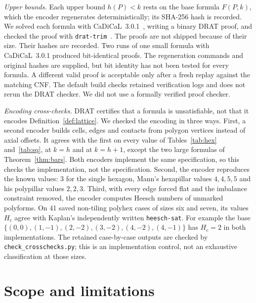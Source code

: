 \documentclass[11pt]{amsart}
\theoremstyle{definition}
\theoremstyle{remark}
\begin{document}
\emph{Upper bounds.} Each upper bound $h(P)<k$ rests on the base formula $F(P,k)$, which the encoder regenerates deterministically; its SHA-256 hash is recorded. We solved each formula with CaDiCaL~3.0.1~\cite{CaDiCaL}, writing a binary DRAT proof, and checked the proof with \texttt{drat-trim}~\cite{DRATtrim}. The proofs are not shipped because of their size. Their hashes are recorded. Two runs of one small formula with CaDiCaL~3.0.1 produced bit-identical proofs. The regeneration commands and original hashes are supplied, but bit identity has not been tested for every formula. A different valid proof is acceptable only after a fresh replay against the matching CNF. The default build checks retained verification logs and does not rerun the DRAT checker. We did not use a formally verified proof checker.

\emph{Encoding cross-checks.} DRAT certifies that a formula is unsatisfiable, not that it encodes Definition~\ref{def:lattice}. We checked the encoding in three ways. First, a second encoder builds cells, edges and contacts from polygon vertices instead of axial offsets. It agrees with the first on every value of Tables~\ref{tab:hex} and~\ref{tab:sq}, at $k=h$ and at $k=h+1$, except the two large formulas of Theorem~\ref{thm:bars}. Both encoders implement the same specification, so this checks the implementation, not the specification. Second, the encoder reproduces the known values: $3$ for the single hexagon, Mann's hexapillar values $4,4,5,5$ and his polypillar values $2,2,3$. Third, with every edge forced flat and the imbalance constraint removed, the encoder computes Heesch numbers of unmarked polyforms. On 41 saved non-tiling polyhex cases of sizes six and seven, its values $H_c$ agree with Kaplan's independently written \texttt{heesch-sat}. For example the base $\{(0,0),(1,-1),(2,-2),(3,-2),(4,-2),(4,-1)\}$ has $H_c=2$ in both implementations. The retained case-by-case outputs are checked by \texttt{check\_crosschecks.py}; this is an implementation control, not an exhaustive classification at those sizes.



\section{Scope and limitations}
\end{document}
